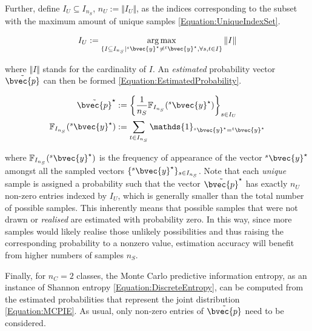 			Further, define $I_{U} \subseteq I_{n_{S}}$, $n_{U} := \Vert I_{U} \Vert$, as the indices corresponding to the subset with the maximum amount of unique samples \eqref{Equation:UniqueIndexSet}.
			
			\begin{equation}
				I_{U} := \argmax_{\{I \subseteq I_{n_{S}} | {^{s}}\bvec{y}^{\star} \neq {^{t}}\bvec{y}^{\star}, \forall s, t \in I\}} \Vert I \Vert 
			\label{Equation:UniqueIndexSet}
			\end{equation}			
			
			where $\Vert I \Vert$  stands for the cardinality of $I$. An \textit{estimated} probability vector $\tilde{\bvec{p}}$ can then be formed \eqref{Equation:EstimatedProbability}.

			\begin{equation}
				\begin{aligned}
					\tilde{\bvec{p}}^{\star} &:= \bigg\{ \frac{1}{n_{S}}\mathbb{F}_{I_{n_{S}}}({^{s}}\bvec{y}^{\star}) \bigg\}_{s \in I_{U}} \\
					\mathbb{F}_{I_{n_{S}}}({^{s}}\bvec{y}^{\star}) &:= \sum_{t \in I_{n_{S}}} \mathds{1}_{{^{s}}\bvec{y}^{\star} = {^{t}}\bvec{y}^{\star}}
				\end{aligned}
			\label{Equation:EstimatedProbability}
			\end{equation}
			
			where $\mathbb{F}_{I_{n_{S}}}({^{s}}\bvec{y}^{\star})$ is the frequency of appearance of the vector ${^{s}}\bvec{y}^{\star}$ amongst all the sampled vectors $\{ {^{s}}\bvec{y}^{\star} \}_{s \in I_{n_{S}}}$. Note that each \textit{unique} sample is assigned a probability such that the vector $\tilde{\bvec{p}}^{\star}$ has exactly $n_{U}$ non-zero entries indexed by $I_{U}$, which is generally smaller than the total number of possible samples. This inherently means that possible samples that were not drawn or \textit{realised} are estimated with probability zero. In this way, since more samples would likely realise those unlikely possibilities and thus raising the corresponding probability to a nonzero value, estimation accuracy will benefit from higher numbers of samples $n_{S}$.
			
			Finally,  for $n_{C} = 2$ classes, the Monte Carlo predictive information entropy, as an instance of Shannon entropy \eqref{Equation:DiscreteEntropy}, can be computed from the estimated probabilities that represent the joint distribution \eqref{Equation:MCPIE}. As usual, only non-zero entries of $\tilde{\bvec{p}}$ need to be considered. 
			
